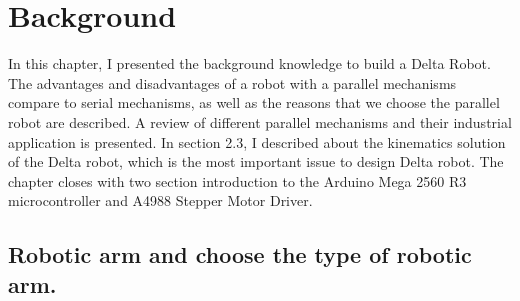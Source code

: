 \makeatletter
\def\maxwidth#1{\ifdim\Gin@nat@width>#1 #1\else\Gin@nat@width\fi}
\makeatother

\chapter{Background}

In this chapter, I presented the background knowledge to build a Delta Robot. The advantages and disadvantages of a robot with a parallel mechanisms compare to serial mechanisms, as well as the reasons that we choose the parallel robot are described. A review of different parallel mechanisms and their industrial application is presented. 
In section 2.3, I described about the kinematics solution of the Delta robot, which is the most important issue to design Delta robot.
The chapter closes with two section introduction to the Arduino Mega 2560 R3 microcontroller and A4988 Stepper Motor Driver.

\section{Robotic arm and choose the type of robotic arm.}

